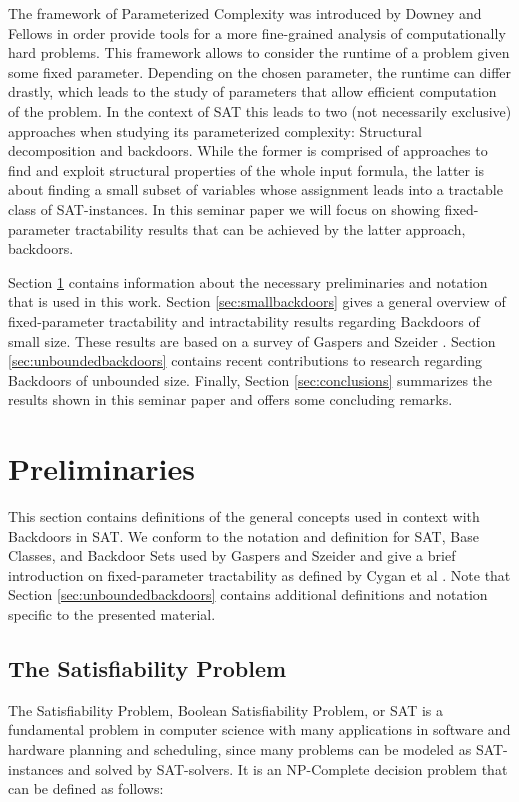 \documentclass[11pt,a4paper]{article}
\makeatletter
\newcommand{\problemtitle}[1]{\gdef\@problemtitle{#1}}%
\newcommand{\probleminput}[1]{\gdef\@probleminput{#1}}%
\newcommand{\problemquestion}[1]{\gdef\@problemquestion{#1}}%
\theoremstyle{definition}
\theoremstyle{proposition}
\makeatother
\begin{document}
The framework of Parameterized Complexity was introduced by Downey and Fellows \cite{downeyFellows} in order provide tools for a more fine-grained analysis of computationally hard problems. This framework allows to consider the runtime of a problem given some fixed parameter. Depending on the chosen parameter, the runtime can differ drastly, which leads to the study of parameters that allow efficient computation of the problem. In the context of SAT this leads to two (not necessarily exclusive) approaches when studying its parameterized complexity: Structural decomposition and backdoors. While the former is comprised of approaches to find and exploit structural properties of the whole input formula, the latter is about finding a small subset of variables whose assignment leads into a tractable class of SAT-instances. In this seminar paper we will focus on showing fixed-parameter tractability results that can be achieved by the latter approach, backdoors. 

Section \ref{sec:preliminaries} contains information about the necessary preliminaries and notation that is used in this work. Section \ref{sec:smallbackdoors} gives a general overview of fixed-parameter tractability and intractability results regarding Backdoors of small size. These results are based on a survey of Gaspers and Szeider \cite{Gaspers2012}. Section \ref{sec:unboundedbackdoors} contains recent contributions to research regarding Backdoors of unbounded size. Finally, Section \ref{sec:conclusions} summarizes the results shown in this seminar paper and offers some concluding remarks. 



\section{Preliminaries}
\label{sec:preliminaries}

This section contains definitions of the general concepts used in context with Backdoors in SAT. We conform to the notation and definition for SAT, Base Classes, and Backdoor Sets used by Gaspers and Szeider \cite{Gaspers2012} and give a brief introduction on fixed-parameter tractability as defined by Cygan et al \cite{Cygan2015}. Note that Section \ref{sec:unboundedbackdoors} contains additional definitions and notation specific to the presented material. 
\subsection{The Satisfiability Problem}
The Satisfiability Problem, Boolean Satisfiability Problem, or SAT is a fundamental problem in computer science with many applications in software and hardware planning and scheduling, since many problems can be modeled as SAT-instances and solved by SAT-solvers. It is an NP-Complete decision problem that can be defined as follows: 
\begin{csproblem}
\problemtitle{SAT}
\probleminput{A propositional logic formula $F$ in conjunctive normal form (CNF) over propositional variables $X = \{x_1, x_2, ... , x_n\}$}
\problemquestion{Is there a truth assignment $\tau: X \to \{0,1\}$ (or $\tau \in 2^X$) such that $F[\tau]$ evaluates to $1$?}
\end{csproblem}
\end{document}
